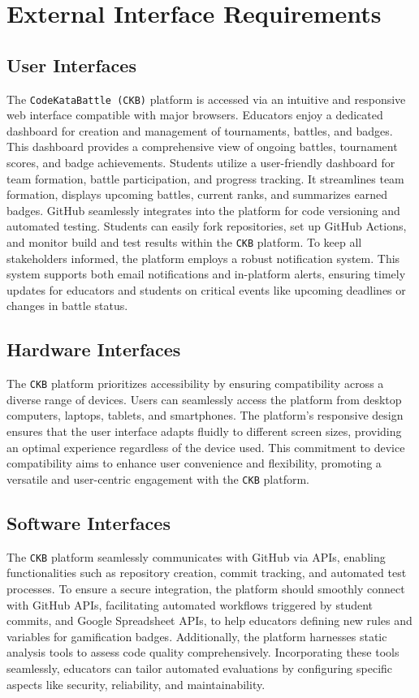 \section{External Interface Requirements}
\label{sec:external_interface_requirements}%

\subsection{User Interfaces}
\label{subsec:user_interfaces}%
The \verb|CodeKataBattle (CKB)| platform is accessed via an intuitive and responsive web interface compatible with major browsers.
Educators enjoy a dedicated dashboard for creation and management of tournaments, battles, and badges. This dashboard provides a comprehensive view of ongoing battles, tournament scores, and badge achievements.
Students utilize a user-friendly dashboard for team formation, battle participation, and progress tracking. It streamlines team formation, displays upcoming battles, current ranks, and summarizes earned badges.
GitHub seamlessly integrates into the platform for code versioning and automated testing. Students can easily fork repositories, set up GitHub Actions, and monitor build and test results within the \verb|CKB| platform.
To keep all stakeholders informed, the platform employs a robust notification system. This system supports both email notifications and in-platform alerts, 
ensuring timely updates for educators and students on critical events like upcoming deadlines or changes in battle status.

\subsection{Hardware Interfaces}
\label{subsec:hardware_interfaces}%
The \verb|CKB| platform prioritizes accessibility by ensuring compatibility across a diverse range of devices. 
Users can seamlessly access the platform from desktop computers, laptops, tablets, and smartphones. 
The platform's responsive design ensures that the user interface adapts fluidly to different screen sizes, providing an optimal experience regardless of the device used. 
This commitment to device compatibility aims to enhance user convenience and flexibility, promoting a versatile and user-centric engagement with the \verb|CKB| platform.

\subsection{Software Interfaces}
\label{subsec:software_interfaces}%
The \verb|CKB| platform seamlessly communicates with GitHub via APIs, enabling functionalities such as repository creation, commit tracking, and automated test processes.
To ensure a secure integration, the platform should smoothly connect with GitHub APIs, facilitating automated workflows triggered by student commits, and Google Spreadsheet APIs, to help educators defining new rules and variables for gamification badges.
Additionally, the platform harnesses static analysis tools to assess code quality comprehensively.
Incorporating these tools seamlessly, educators can tailor automated evaluations by configuring specific aspects like security, reliability, and maintainability. 

